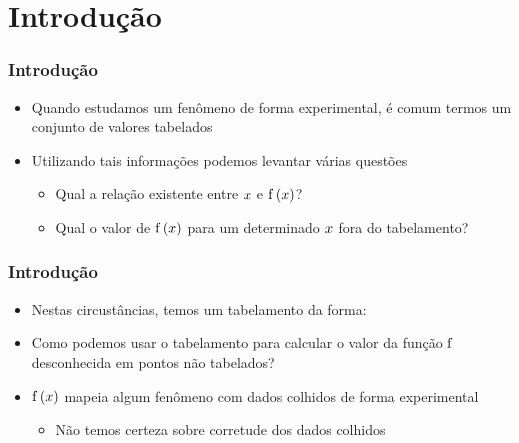 \section{Introdução}

\begin{frame}
\frametitle{Introdução}

\begin{itemize}
  \item Quando estudamos um fenômeno de forma experimental, é comum termos um conjunto de valores tabelados
  \item Utilizando tais informações podemos levantar várias questões
    \begin{itemize}
      \item Qual a relação existente entre $x$ e $\mathrm{f}\left(x\right)$?
      \item Qual o valor de $\mathrm{f}\left(x\right)$ para um determinado $x$ fora do tabelamento?
    \end{itemize}
\end{itemize}
\end{frame}

\begin{frame}
\frametitle{Introdução}

\begin{itemize}
  \item Nestas circustâncias, temos um tabelamento da forma:
%
\begin{center}
\end{center}
%
  \item Como podemos usar o tabelamento para calcular o valor da função $\mathrm{f}$ desconhecida em pontos não tabelados?
  \item $\mathrm{f}\left(x\right)$ mapeia algum fenômeno com dados colhidos de forma experimental
    \begin{itemize}
      \item<3-> Não temos certeza sobre corretude dos dados colhidos
    \end{itemize}
\end{itemize}

\end{frame}

